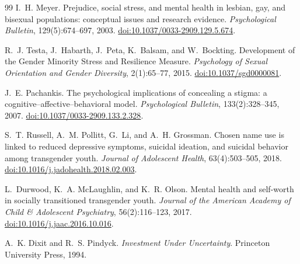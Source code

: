 \documentclass[11pt,a4paper]{article}
\theoremstyle{remark}
\begin{document}
\begin{thebibliography}{99}
I.~H. Meyer.
Prejudice, social stress, and mental health in lesbian, gay, and bisexual populations: conceptual issues and research evidence.
\emph{Psychological Bulletin}, 129(5):674--697, 2003.
\href{https://doi.org/10.1037/0033-2909.129.5.674}{doi:10.1037/0033-2909.129.5.674}.

R.~J. Testa, J.~Habarth, J.~Peta, K.~Balsam, and W.~Bockting.
Development of the Gender Minority Stress and Resilience Measure.
\emph{Psychology of Sexual Orientation and Gender Diversity}, 2(1):65--77, 2015.
\href{https://doi.org/10.1037/sgd0000081}{doi:10.1037/sgd0000081}.

J.~E. Pachankis.
The psychological implications of concealing a stigma: a cognitive--affective--behavioral model.
\emph{Psychological Bulletin}, 133(2):328--345, 2007.
\href{https://doi.org/10.1037/0033-2909.133.2.328}{doi:10.1037/0033-2909.133.2.328}.

S.~T. Russell, A.~M. Pollitt, G.~Li, and A.~H. Grossman.
Chosen name use is linked to reduced depressive symptoms, suicidal ideation, and suicidal behavior among transgender youth.
\emph{Journal of Adolescent Health}, 63(4):503--505, 2018.
\href{https://doi.org/10.1016/j.jadohealth.2018.02.003}{doi:10.1016/j.jadohealth.2018.02.003}.

L.~Durwood, K.~A. McLaughlin, and K.~R. Olson.
Mental health and self-worth in socially transitioned transgender youth.
\emph{Journal of the American Academy of Child \& Adolescent Psychiatry}, 56(2):116--123, 2017.
\href{https://doi.org/10.1016/j.jaac.2016.10.016}{doi:10.1016/j.jaac.2016.10.016}.

A.~K. Dixit and R.~S. Pindyck.
\emph{Investment Under Uncertainty}.
Princeton University Press, 1994.

\end{thebibliography}
\end{document}
